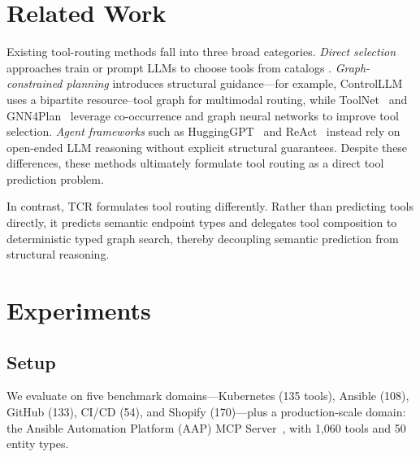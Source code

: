 \documentclass{article}
\begin{document}
\section{Related Work}

Existing tool-routing methods fall into three broad categories. \textit{Direct selection} approaches train or prompt LLMs to choose tools from catalogs \citep{qin2024toolllm,patil2024gorilla,schick2023toolformer,du2024anytool}. \textit{Graph-constrained planning} introduces structural guidance---for example, ControlLLM~\citep{liu2024controlllm} uses a bipartite resource--tool graph for multimodal routing, while ToolNet~\citep{liu2024toolnet} and GNN4Plan~\citep{wu2024gnn4plan} leverage co-occurrence and graph neural networks to improve tool selection. \textit{Agent frameworks} such as HuggingGPT~\citep{shen2023hugginggpt} and ReAct~\citep{yao2023react} instead rely on open-ended LLM reasoning without explicit structural guarantees. Despite these differences, these methods ultimately formulate tool routing as a direct tool prediction problem.

In contrast, TCR formulates tool routing differently. Rather than predicting tools directly, it predicts semantic endpoint types and delegates tool composition to deterministic typed graph search, thereby decoupling semantic prediction from structural reasoning.


\section{Experiments}

\subsection{Setup}

We evaluate on five benchmark domains---Kubernetes (135 tools), Ansible (108), GitHub (133), CI/CD (54), and Shopify (170)---plus a production-scale domain: the Ansible Automation Platform (AAP) MCP Server~\citep{anthropic2024mcp}, with 1,060 tools and 50 entity types.
\end{document}
